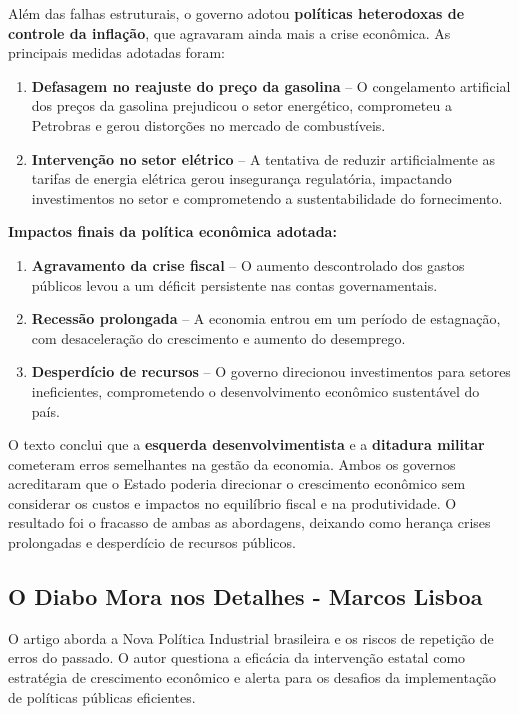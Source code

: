 \documentclass[a4paper,12pt]{article}[abntex2]
\begin{document}
Além das falhas estruturais, o governo adotou \textbf{políticas heterodoxas de controle da inflação}, que agravaram ainda mais a crise econômica. As principais medidas adotadas foram:

\begin{enumerate}
    \item \textbf{Defasagem no reajuste do preço da gasolina} – O congelamento artificial dos preços da gasolina prejudicou o setor energético, comprometeu a Petrobras e gerou distorções no mercado de combustíveis.
    \item \textbf{Intervenção no setor elétrico} – A tentativa de reduzir artificialmente as tarifas de energia elétrica gerou insegurança regulatória, impactando investimentos no setor e comprometendo a sustentabilidade do fornecimento.
\end{enumerate}

\textbf{Impactos finais da política econômica adotada:}

\begin{enumerate}
    \item \textbf{Agravamento da crise fiscal} – O aumento descontrolado dos gastos públicos levou a um déficit persistente nas contas governamentais.
    \item \textbf{Recessão prolongada} – A economia entrou em um período de estagnação, com desaceleração do crescimento e aumento do desemprego.
    \item \textbf{Desperdício de recursos} – O governo direcionou investimentos para setores ineficientes, comprometendo o desenvolvimento econômico sustentável do país.
\end{enumerate}

O texto conclui que a \textbf{esquerda desenvolvimentista} e a \textbf{ditadura militar} cometeram erros semelhantes na gestão da economia. Ambos os governos acreditaram que o Estado poderia direcionar o crescimento econômico sem considerar os custos e impactos no equilíbrio fiscal e na produtividade. O resultado foi o fracasso de ambas as abordagens, deixando como herança crises prolongadas e desperdício de recursos públicos.

\subsection{\textbf{O Diabo Mora nos Detalhes - Marcos Lisboa}}

O artigo aborda a Nova Política Industrial brasileira e os riscos de repetição de erros do passado. O autor questiona a eficácia da intervenção estatal como estratégia de crescimento econômico e alerta para os desafios da implementação de políticas públicas eficientes.
\end{document}
